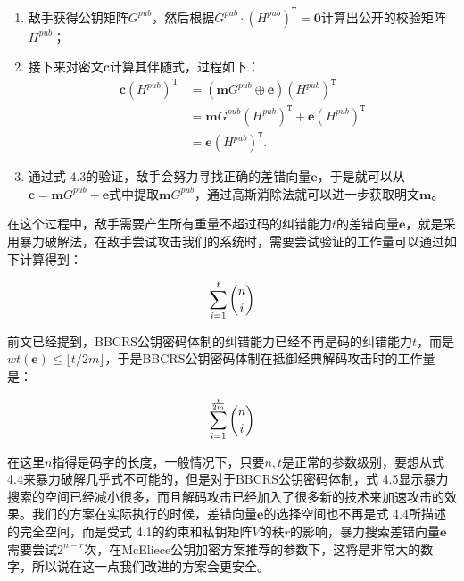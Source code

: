 \begin{enumerate}
	\item 敌手获得公钥矩阵$G^{pub}$，然后根据$G^{pub} \cdot (H^{pub})^\mathtt{T} = \mathbf{0}$计算出公开的校验矩阵$H^{pub}$；
	\item 接下来对密文$\mathbf{c}$计算其伴随式，过程如下：
	\begin{equation}
		\begin{aligned}
			\mathbf{c}(H^{pub})^\mathrm{T} & = (\mathbf{m}G^{pub} \oplus\mathbf{e})(H^{pub})^\mathtt{T} \\
			& = \mathbf{m}G^{pub}(H^{pub})^\mathtt{T} + \mathbf{e}(H^{pub})^\mathtt{T} \\
			& = \mathbf{e}(H^{pub})^\mathtt{T}.
		\end{aligned}
	\end{equation}
	\item 通过式 4.3的验证，敌手会努力寻找正确的差错向量$\mathbf{e}$，于是就可以从$\mathbf{c} = \mathbf{m}G^{pub} + \mathbf{e}$式中提取$\mathbf{m}G^{pub}$，通过高斯消除法就可以进一步获取明文$\mathbf{m}$。		
\end{enumerate}

在这个过程中，敌手需要产生所有重量不超过码的纠错能力$t$的差错向量$\mathbf{e}$，就是采用暴力破解法，在敌手尝试攻击我们的系统时，需要尝试验证的工作量可以通过如下计算得到：

\begin{equation}\label{Eq:numberOfErrorVectionInOriginalAttack}
\sum_{i=1}^{t} \dbinom{n}{i}
\end{equation}

前文已经提到，BBCRS公钥密码体制的纠错能力已经不再是码的纠错能力$t$，而是$wt(\mathbf{e}) \leq \lfloor t/2m \rfloor$，于是BBCRS公钥密码体制在抵御经典解码攻击时的工作量是：

\begin{equation}\label{Eq:numberOfErrorVectionInBBCRSScheme}
\sum_{i=1}^{\frac{t}{2m}} \dbinom{n}{i}
\end{equation}

在这里$n$指得是码字的长度，一般情况下，只要$n,t$是正常的参数级别，要想从式 4.4来暴力破解几乎式不可能的，但是对于BBCRS公钥密码体制，式 4.5显示暴力搜索的空间已经减小很多，而且解码攻击已经加入了很多新的技术来加速攻击的效果。我们的方案在实际执行的时候，差错向量$\mathbf{e}$的选择空间也不再是式 4.4所描述的完全空间，而是受式 4.1的约束和私钥矩阵$V$的秩$r$的影响，暴力搜索差错向量$\mathbf{e}$需要尝试$2^{n-r}$次，在McEliece公钥加密方案推荐的参数下，这将是非常大的数字，所以说在这一点我们改进的方案会更安全。


